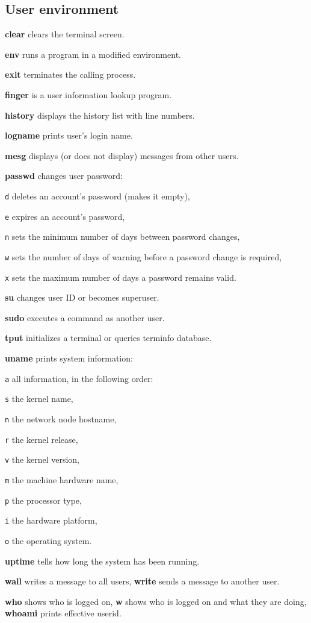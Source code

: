 \subsection{User environment}
\textbf{clear} clears the terminal screen. 

\textbf{env} runs a program in a modified environment.

\textbf{exit} terminates the calling process.

\textbf{finger} is a user information lookup program. 

\textbf{history} displays the history list with line numbers.

\textbf{logname} prints user's login name.

\textbf{mesg} displays (or does not display) messages from other users.

\manualbreak

\textbf{passwd} changes user password:
\begin{enumx}
	\item [\texttt{d}] deletes an account's password (makes it empty),
	\item [\texttt{e}] expires an account's password,
	\item [\texttt{n}] sets the minimum number of days between password changes,
	\item [\texttt{w}] sets the number of days of warning 
	before a password change is required,
	\item [\texttt{x}] sets the maximum number of days a password remains valid.
\end{enumx}

\textbf{su} changes user ID or becomes superuser.

\textbf{sudo} executes a command as another user.


\textbf{tput} initializes a terminal or queries terminfo database.

\textbf{uname} prints system information:
\begin{enumx}
	\item [\texttt{a}] all information, in the following order:
	\item [\texttt{s}] the kernel name,
	\item [\texttt{n}] the network node hostname,
	\item [\texttt{r}] the kernel release,
	\item [\texttt{v}] the kernel version,
	\item [\texttt{m}] the machine hardware name,
	\item [\texttt{p}] the processor type,
	\item [\texttt{i}] the hardware platform,
	\item [\texttt{o}] the operating system.
\end{enumx}

\textbf{uptime} tells how long the system has been running.

\textbf{wall} writes a message to all users,
\textbf{write} sends a message to another user. 

\textbf{who} shows who is logged on,
\textbf{w} shows who is logged on and what they are doing,
\textbf{whoami} prints effective userid.
